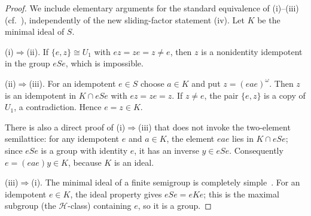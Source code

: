\begin{proof}
We include elementary arguments for the standard equivalence of (i)--(iii)
(cf.~\cite[Proposition~2.3]{AlmeidaEtAl2009}), independently of the new
sliding-factor statement (iv).  Let $K$ be the minimal ideal of $S$.

(i)$\Rightarrow$(ii).  If $\{e,z\}\cong U_1$ with
$ez=ze=z\ne e$, then $z$ is a nonidentity idempotent in the group
$eSe$, which is impossible.

(ii)$\Rightarrow$(iii).  For an idempotent $e\in S$ choose $a\in K$
and put $z=(eae)^\omega$.  Then $z$ is an idempotent in
$K\cap eSe$ with $ez=ze=z$.  If $z\ne e$, the pair
$\{e,z\}$ is a copy of $U_1$, a contradiction.  Hence $e=z\in K$.

There is also a direct proof of (i)$\Rightarrow$(iii) that does
not invoke the two-element semilattice: for any idempotent $e$ and
$a\in K$, the element $eae$ lies in $K\cap eSe$; since $eSe$
is a group with identity $e$, it has an inverse $y\in eSe$.
Consequently $e=(eae)y\in K$, because $K$ is an ideal.

(iii)$\Rightarrow$(i).  The minimal ideal of a finite semigroup
is completely simple~\cite{Howie1995}.  For an idempotent $e\in K$,
the ideal property gives $eSe=eKe$; this is the maximal subgroup
(the $\mathcal H$-class) containing $e$, so it is a group.


\end{proof}
